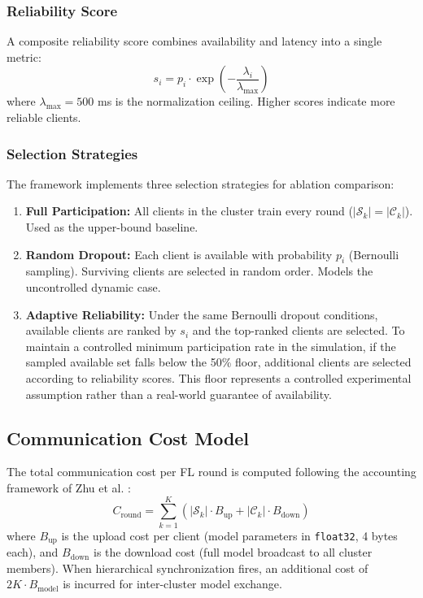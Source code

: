 \subsubsection{Reliability Score}
A composite reliability score combines availability and latency into a single metric:
\begin{equation}
\label{eq:reliability}
s_i = p_i \cdot \exp\left(-\frac{\lambda_i}{\lambda_{\max}}\right)
\end{equation}
where $\lambda_{\max} = 500$ ms is the normalization ceiling. Higher scores indicate more reliable clients.

\subsubsection{Selection Strategies}
The framework implements three selection strategies for ablation comparison:
\begin{enumerate}
    \item \textbf{Full Participation:} All clients in the cluster train every round ($|\mathcal{S}_k| = |\mathcal{C}_k|$). Used as the upper-bound baseline.
    \item \textbf{Random Dropout:} Each client is available with probability $p_i$ (Bernoulli sampling). Surviving clients are selected in random order. Models the uncontrolled dynamic case.
    \item \textbf{Adaptive Reliability:} Under the same Bernoulli dropout conditions, available clients are ranked by $s_i$ and the top-ranked clients are selected. To maintain a controlled minimum participation rate in the simulation, if the sampled available set falls below the 50\% floor, additional clients are selected according to reliability scores. This floor represents a controlled experimental assumption rather than a real-world guarantee of availability.
\end{enumerate}

\subsection{Communication Cost Model}
\label{sec:comm_cost}
The total communication cost per FL round is computed following the accounting framework of Zhu et al. \cite{zhu2025cmba}:
\begin{equation}
\label{eq:comm_cost}
C_{\text{round}} = \sum_{k=1}^{K} \left( |\mathcal{S}_k| \cdot B_{\text{up}} + |\mathcal{C}_k| \cdot B_{\text{down}} \right)
\end{equation}
where $B_{\text{up}}$ is the upload cost per client (model parameters in \texttt{float32}, 4 bytes each), and $B_{\text{down}}$ is the download cost (full model broadcast to all cluster members). When hierarchical synchronization fires, an additional cost of $2K \cdot B_{\text{model}}$ is incurred for inter-cluster model exchange.
